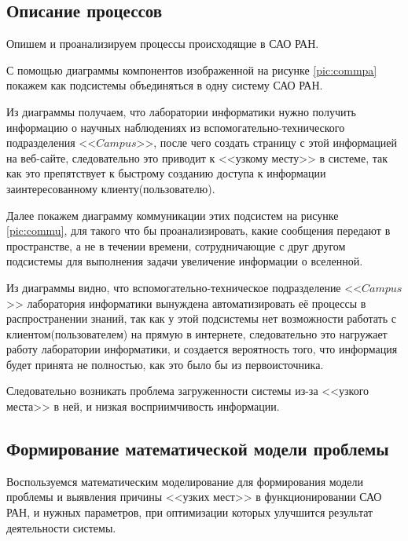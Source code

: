    
\subsection{Описание процессов}

Опишем и проанализируем процессы происходящие в САО РАН. 

С помощью диаграммы компонентов изображенной на рисунке \ref{pic:commpa} покажем как подсистемы объединяться в одну систему САО РАН. 

Из диаграммы получаем, что лаборатории информатики нужно получить информацию о научных наблюдениях из вспомогательно-технического подразделения <<$Campus$>>, после чего создать страницу с этой информацией на веб-сайте, следовательно это приводит к <<узкому месту>> в системе, так как это препятствует к быстрому созданию доступа к информации заинтересованному клиенту(пользователю).

Далее покажем диаграмму коммуникации этих подсистем на рисунке \ref{pic:commu}, для такого что бы проанализировать, какие сообщения передают в пространстве, а не в течении времени, сотрудничающие с друг другом подсистемы для выполнения задачи увеличение информации о вселенной.


Из диаграммы видно, что вспомогательно-техническое подразделение <<$Campus$>> лаборатория информатики вынуждена автоматизировать её процессы в распространении знаний, так как у этой подсистемы нет возможности работать с клиентом(пользователем) на прямую в интернете, следовательно это нагружает работу лаборатории информатики, и создается вероятность того, что информация будет принята не полностью, как это было бы из первоисточника.

Следовательно возникать проблема загруженности системы из-за <<узкого места>> в ней, и низкая восприимчивость информации. 


\subsection{Формирование математической модели проблемы}
Воспользуемся математическим моделирование для формирования модели проблемы и выявления причины <<узких мест>> в функционировании САО РАН, и нужных параметров, при оптимизации которых улучшится результат деятельности системы.

